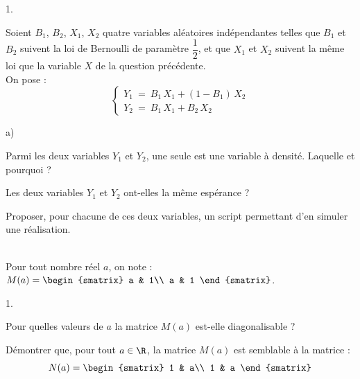 \documentclass[11pt]{article}%
\begin{document}
\begin{exerciceAP}
\begin{noliste}{1.}
    \item Soient $B_1$, $B_2$, $X_1$, $X_2$ quatre variables
      aléatoires indépendantes telles que $B_1$ et $B_2$ suivent la loi de 
      Bernoulli de paramètre $\dfrac{1}{2}$, et que $X_1$ et $X_2$ 
      suivent la même loi que la variable $X$ de la question
      précédente.\\
      On pose :
      \[
        \left\{
        \begin{array}{l}
          Y_1 \ = \ B_1 \, X_1 + (1-B_1) \, X_2
          \\[.2cm]
          Y_2 \ = \ B_1 \, X_1 + B_2 \, X_2
        \end{array}
        \right.
      \]
      \begin{noliste}{a)}
      \item Parmi les deux variables $Y_1$ et $Y_2$, une seule est une
        variable à densité. Laquelle et pourquoi ?
        
      \item Les deux variables $Y_1$ et $Y_2$ ont-elles la même
        espérance ?
        
      \item Proposer, pour chacune de ces deux variables, un script
        \Scilab{} permettant d'en simuler une réalisation.
      \end{noliste}
  \end{noliste}
\end{exerciceAP}


\begin{exerciceSP}~\\
  Pour tout nombre réel $a$, on note : $M(a) =
  \begin{smatrix}
   a & 1\\
   a & 1
  \end{smatrix}$.
  \begin{noliste}{1.}
   \item Pour quelles valeurs de $a$ la matrice $M(a)$ est-elle 
     diagonalisable ?
   
   \item Démontrer que, pour tout $a\in \R$, la matrice $M(a)$ est
     semblable à la matrice :
     \[
       N(a) =
       \begin{smatrix}
         1 & a\\
         1 & a
       \end{smatrix}
     \]
  \end{noliste}
\end{exerciceSP}
\end{document}
